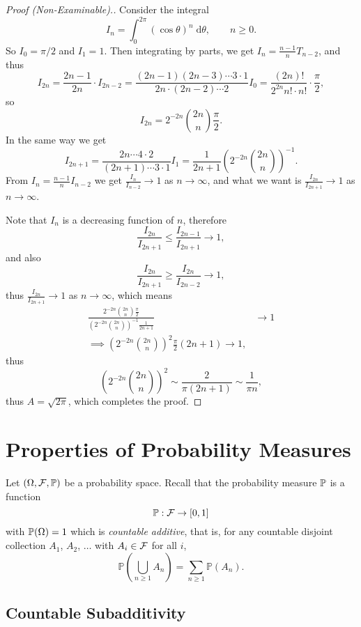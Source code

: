 \documentclass[a4paper]{scrreprt}
\begin{document}
\begin{proof}[Proof (Non-Examinable).]
	Consider the integral
	$$
	I_n = \int_0^{2 \pi} (\cos \theta)^n \; \mathrm{d}\theta, \quad \quad n \geq 0.
	$$
	So $I_0 = \pi/2$ and $I_1 = 1$. Then integrating by parts, we get $I_n = \frac{n - 1}{n} T_{n - 2}$, and thus
	$$
	I_{2n} = \frac{2n - 1}{2n} \cdot I_{2n - 2} = \frac{(2n - 1)(2n - 3)\cdots 3 \cdot 1}{2n \cdot (2n - 2) \cdots 2} I_0 = \frac{(2n)!}{2^{2n} n! \cdot n!} \cdot \frac{\pi}{2},
	$$
	so
	$$
	I_{2n} = 2^{-2n} \binom{2n}{n} \frac{\pi}{2}.
	$$
	In the same way we get
	$$
	I_{2n + 1} = \frac{2n \cdots 4 \cdot 2}{(2n + 1) \cdots 3 \cdot 1} I_1 = \frac{1}{2n + 1} \left(2^{-2n} \binom{2n}{n}\right)^{-1}.
	$$
	From $I_n = \frac{n - 1}{n}I_{n - 2}$ we get $\frac{I_n}{I_{n - 2}}\rightarrow 1$ as $n \rightarrow \infty$, and what we want is
	$\frac{I_{2n}}{I_{2n + 1}} \rightarrow 1$ as $n \rightarrow \infty$.

	Note that $I_n$ is a decreasing function of $n$, therefore
	$$
	\frac{I_{2n}}{I_{2n + 1}} \leq \frac{I_{2n - 1}}{I_{2n + 1}} \rightarrow 1,
	$$
	and also
	$$
	\frac{I_{2n}}{I_{2n + 1}} \geq \frac{I_{2n}}{I_{2n - 2}} \rightarrow 1,
	$$
	thus $\frac{I_{2n}}{I_{2n+ 1}} \rightarrow 1$ as $n \rightarrow \infty$, which means
	\begin{align*}
		\frac{2^{-2n} \binom{2n}{n} \frac{\pi}{2}}{\left(2^{-2n} \binom{2n}{n}\right)^{-1} \frac{1}{2n + 1}} &\rightarrow 1 \\
\implies \left(2^{-2n} \binom{2n}{n}\right)^{2} \frac{\pi}{2} (2n + 1) \rightarrow 1,
	\end{align*}
	thus
	$$
	\left(2^{-2n} \binom{2n}{n}\right)^{2} \sim \frac{2}{\pi (2n + 1)} \sim \frac{1}{\pi n},
	$$
	thus $A = \sqrt{2 \pi}$, which completes the proof.
\end{proof}

\section{Properties of Probability Measures}

Let $(\Omega, \mathcal{F}, \mathbb{P})$ be a probability space. Recall that the probability measure $\mathbb{P}$ is a function
$$
\mathbb{P} : \mathcal{F} \rightarrow [0, 1]
$$
with $\mathbb{P}(\Omega) = 1$ which is \emph{countable additive}, that is, for any countable disjoint collection $A_1$, $A_2$, $\dots$ with $A_i \in \mathcal{F}$ for all $i$,
$$
\mathbb{P}\left(\bigcup_{n \geq 1} A_{n}\right)=\sum_{n \geq 1} \mathbb{P}\left(A_{n}\right).
$$

\subsection{Countable Subadditivity}
\end{document}
